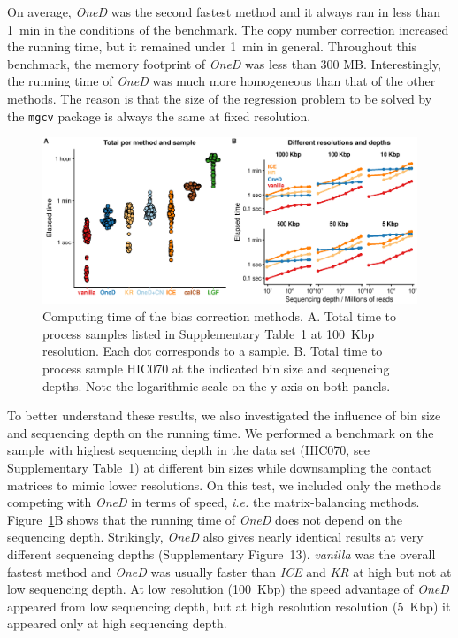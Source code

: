\documentclass[a4,center,fleqn]{NAR}
\providecommand{\DIFadd}[1]{{\protect\color{red}#1}} %
\providecommand{\DIFdel}[1]{{\protect}}                      %
\providecommand{\DIFaddbegin}{} %
\providecommand{\DIFaddend}{} %
\providecommand{\DIFdelbegin}{} %
\providecommand{\DIFdelend}{} %
\providecommand{\DIFaddFL}[1]{\DIFadd{#1}} %
\begin{document}
\DIFaddbegin \DIFadd{On average, }\DIFaddend \textit{OneD} was the second fastest method and it always ran in less than
1~min in the conditions of the benchmark. \DIFaddbegin \DIFadd{The copy number correction
increased the running time, but it remained under 1~min in general.
}\DIFaddend Throughout this benchmark, the memory footprint of \textit{OneD} was less
than 300 MB.  Interestingly, the running time of \textit{OneD} was much
more homogeneous than that of the other methods. The reason is that the
size of the regression problem to be solved by the \texttt{mgcv} package
is always the same at fixed resolution.

\DIFdelbegin \DIFdel{We also }\DIFdelend \DIFaddbegin \begin{figure}
\centerline{\includegraphics[width=.49\textwidth]{figure_6.eps}}
\caption{\DIFaddFL{Computing time of the bias correction methods. A. Total time to
process samples listed in Supplementary Table~1 at 100~Kbp resolution.
Each dot corresponds to a sample. B. Total time to process sample HIC070
at the indicated bin size and sequencing depths. Note the logarithmic
scale on the y-axis on both panels.}}
\label{fig:times}
\end{figure}

\DIFadd{To better understand these results, we also investigated the influence of
bin size and sequencing depth on the running time. We }\DIFaddend performed a
benchmark on \DIFdelbegin \DIFdel{a smaller data set
at increasing
resolution (Figure~\ref{fig:times}B) }\DIFdelend \DIFaddbegin \DIFadd{the sample with highest sequencing depth in the data set
(HIC070, see Supplementary Table~1) at different bin sizes while
downsampling the contact matrices to mimic lower resolutions}\DIFaddend . On this
\DIFdelbegin \DIFdel{benchmark, }\DIFdelend \DIFaddbegin \DIFadd{test, we included only the methods competing with }\textit{\DIFadd{OneD}} \DIFadd{in terms
of speed, }\textit{\DIFadd{i.e.}} \DIFadd{the matrix-balancing methods.
Figure~\ref{fig:times}B shows that the running time of }\textit{\DIFadd{OneD}} \DIFadd{does
not depend on the sequencing depth. Strikingly, }\textit{\DIFadd{OneD}} \DIFadd{also gives
nearly identical results at very different sequencing depths
(Supplementary Figure~13). }\textit{\DIFadd{vanilla}} \DIFadd{was the overall fastest method
and }\textit{\DIFadd{OneD}} \DIFadd{was usually faster than }\DIFaddend \textit{ICE} \DIFdelbegin \DIFdel{ran
slightly faster than }\DIFdelend \DIFaddbegin \DIFadd{and }\textit{\DIFadd{KR}}
\DIFadd{at high but not at low sequencing depth. At low resolution (100~Kbp) the
speed advantage of }\DIFaddend \textit{OneD} \DIFdelbegin \DIFdel{, and the the rank of the methods
remained the same at all resolutions. }\DIFdelend \DIFaddbegin \DIFadd{appeared from low sequencing depth, but
at high resolution resolution (5~Kbp) it appeared only at high sequencing
depth.
}
\end{document}
